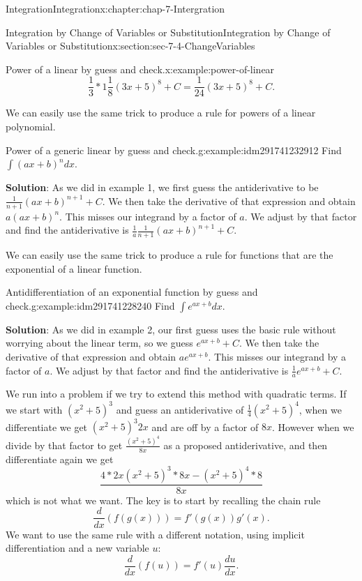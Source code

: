 \documentclass[oneside,10pt,]{book}
\newcommand{\terminology}[1]{\textbf{#1}}
\numberwithin{equation}{section}
\begin{document}
\begin{chapterptx}{Integration}{}{Integration}{}{}{x:chapter:chap-7-Intergration}
\begin{sectionptx}{Integration by Change of Variables or Substitution}{}{Integration by Change of Variables or Substitution}{}{}{x:section:sec-7-4-ChangeVariables}
\begin{example}{Power of a linear by guess and check.}{x:example:power-of-linear}
\begin{equation*}
\frac{1}{3}*1\frac{1}{8} (3x+5)^8+C=\frac{1}{24} (3x+5)^8+C.
\end{equation*}
\end{example}
We can easily use the same trick to produce a rule for powers of a linear polynomial.%
\begin{example}{Power of a generic linear by guess and check.}{g:example:idm291741232912}%
Find \(\int (ax+b)^n  dx\).%
\par
\terminology{Solution}:  As we did in example 1, we first guess the antiderivative to be \(\frac{1}{n+1} (ax+b)^{n+1}+C\). We then take the derivative of that expression and obtain \(a(ax+b)^n\).  This misses our integrand by a factor of \(a\).  We adjust by that factor and find the antiderivative is \(\frac{1}{a}  \frac{1}{n+1} (ax+b)^{n+1}+C\).%
\end{example}
We can easily use the same trick to produce a rule for functions that are the exponential of a linear function.%
\begin{example}{Antidifferentiation of an exponential function by guess and check.}{g:example:idm291741228240}%
Find \(\int e^{ax+b}  dx\).%
\par
\terminology{Solution}:  As we did in example 2, our first guess uses the basic rule without worrying about the linear term, so we guess \(e^{ax+b}+C\). We then take the derivative of that expression and obtain \(ae^{ax+b}\).  This misses our integrand by a factor of \(a\).  We adjust by that factor and find the antiderivative is \(\frac{1}{a} e^{ax+b}+C\).%
\end{example}
We run into a problem if we try to extend this method with quadratic terms.  If we start with \((x^2+5)^3\) and guess an antiderivative of \(\frac{1}{4} (x^2+5)^4\), when we differentiate we get \((x^2+5)^3 2x\) and are off by a factor of \(8x\).  However when we divide by that factor to get \(\frac{(x^2+5)^4}{8x}\) as a proposed antiderivative, and then differentiate again we get%
%
\begin{equation*}
\frac{4*2x(x^2+5)^3*8x-(x^2+5)^4*8}{8x}
\end{equation*}
which is not what we want.  The key is to start by recalling the chain rule%
%
\begin{equation*}
\frac{d}{dx}  (f(g(x)))=f'(g(x))g'(x).
\end{equation*}
We want to use the same rule with a different notation, using implicit differentiation and a new variable \(u\):%
%
\begin{equation*}
\frac{d}{dx}  (f(u))=f'(u)\frac{du}{dx}.

\end{equation*}
\end{sectionptx}
\end{chapterptx}
\end{document}
